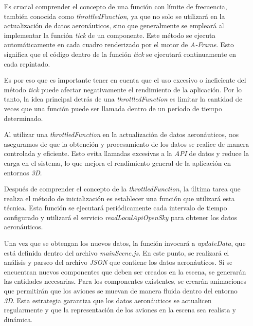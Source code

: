 \documentclass[a4paper, 11pt]{book}
\begin{document}
Es crucial comprender el concepto de una función con límite de frecuencia, también conocida como \emph{throttledFunction}, ya que no solo se utilizará en la actualización de datos aeronáuticos, sino que generalmente se empleará al implementar la función \emph{tick} de un componente. Este método se ejecuta automáticamente en cada cuadro renderizado por el motor de \emph{A-Frame}. Esto significa que el código dentro de la función \emph{tick} se ejecutará continuamente en cada repintado.

Es por eso que es importante tener en cuenta que el uso excesivo o ineficiente del método \emph{tick} puede afectar negativamente el rendimiento de la aplicación. Por lo tanto, la idea principal detrás de una \emph{throttledFunction} es limitar la cantidad de veces que una función puede ser llamada dentro de un período de tiempo determinado.

Al utilizar una \emph{throttledFunction} en la actualización de datos aeronáuticos, nos aseguramos de que la obtención y procesamiento de los datos se realice de manera controlada y eficiente. Esto evita llamadas excesivas a la \emph{API} de datos y reduce la carga en el sistema, lo que mejora el rendimiento general de la aplicación en entornos \emph{3D}.

Después de comprender el concepto de la \emph{throttledFunction}, la última tarea que realiza el método de inicialización es establecer una función que utilizará esta técnica. Esta función se ejecutará periódicamente cada intervalo de tiempo configurado y utilizará el servicio \emph{readLocalApiOpenSky} para obtener los datos aeronáuticos.

Una vez que se obtengan los nuevos datos, la función invocará a \emph{updateData}, que está definida dentro del archivo \emph{mainScene.js}. En este punto, se realizará el análisis y parseo del archivo \emph{JSON} que contiene los datos aeronáuticos. Si se encuentran nuevos componentes que deben ser creados en la escena, se generarán las entidades necesarias. Para los componentes existentes, se crearán animaciones que permitirán que los aviones se muevan de manera fluida dentro del entorno \emph{3D}.
Esta estrategia garantiza que los datos aeronáuticos se actualicen regularmente y que la representación de los aviones en la escena sea realista y dinámica.
\end{document}
